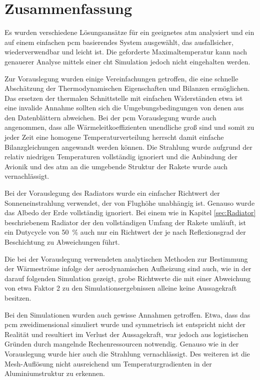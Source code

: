 \chapter{Zusammenfassung}
\label{chap:Zusammenfassung}

Es wurden verschiedene Lösungsansätze für ein geeignetes \ac{atm} analysiert und ein auf einem einfachen \ac{pcm} basierendes System
ausgewählt, das ausfallsicher, wiederverwendbar und leicht ist.
Die geforderte Maximaltemperatur kann nach genauerer Analyse mittels einer \ac{cht} Simulation jedoch nicht eingehalten werden.

Zur Vorauslegung wurden einige Vereinfachungen getroffen, die eine schnelle Abschätzung der Thermodynamischen Eigenschaften
und Bilanzen ermöglichen.
Das ersetzen der thermalen Schnittstelle mit einfachen Widerständen etwa ist eine invalide Annahme sollten sich die Umgebungsbedingungen
von denen aus den Datenblättern abweichen.
Bei der \ac{pcm} Vorauslegung wurde auch angenommen, dass alle Wärmeleitkoeffizienten unendliche groß sind und somit zu jeder Zeit
eine homogene Temperaturverteilung herrscht damit einfache Bilanzgleichungen angewandt werden können.
Die Strahlung wurde aufgrund der relativ niedrigen Temperaturen vollständig ignoriert und
die Anbindung der Avionik und des \ac{atm} an die umgebende Struktur der Rakete wurde auch vernachlässigt.

Bei der Vorauslegung des Radiators wurde ein einfacher Richtwert der Sonneneinstrahlung verwendet, der von Flughöhe unabhängig ist.
Genauso wurde das Albedo der Erde vollständig ignoriert.
Bei einem wie in Kapitel \ref{sec:Radiator} beschriebenem Radiator der den vollständigen Umfang der Rakete umläuft, ist ein Dutycycle von
\SI{50}{\percent} auch nur ein Richtwert der je nach Reflexionsgrad der Beschichtung zu Abweichungen führt.

Die bei der Vorauslegung verwendeten analytischen Methoden zur Bestimmung der Wärmeströme infolge der aerodynamischen Aufheizung sind auch,
wie in der darauf folgenden Simulation gezeigt, grobe Richtwerte die mit einer Abweichung von etwa Faktor 2 zu den Simulationsergebnissen
alleine keine Aussagekraft besitzen.

Bei den Simulationen wurden auch gewisse Annahmen getroffen. Etwa, dass das \ac{pcm} zweidimensional simuliert wurde und symmetrisch ist entspricht
nicht der Realität und resultiert im Verlust der Aussagekraft, war jedoch aus logistischen Gründen durch mangelnde Rechenressourcen notwendig.
Genauso wie in der Vorauslegung wurde hier auch die Strahlung vernachlässigt. Des weiteren ist die Mesh-Auflösung nicht ausreichend um
Temperaturgradienten in der Aluminiumstruktur zu erkennen.

